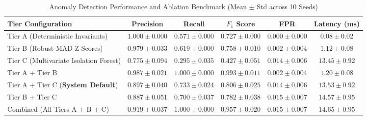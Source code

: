 \begin{table}[t]
\centering
\small
\caption{Anomaly Detection Performance and Ablation Benchmark (Mean $\pm$ Std across 10 Seeds)}
\label{tab:anomaly}
\begin{tabular}{lccccc}
\toprule
\textbf{Tier Configuration} & \textbf{Precision} & \textbf{Recall} & \textbf{$F_1$ Score} & \textbf{FPR} & \textbf{Latency (ms)} \\
\midrule
Tier A (Deterministic Invariants) & $\mathbf{1.000 \pm 0.000}$ & $0.571 \pm 0.000$ & $0.727 \pm 0.000$ & $\mathbf{0.000 \pm 0.000}$ & $0.08 \pm 0.02$ \\
Tier B (Robust MAD Z-Scores) & $0.979 \pm 0.033$ & $0.619 \pm 0.000$ & $0.758 \pm 0.010$ & $0.002 \pm 0.004$ & $1.12 \pm 0.08$ \\
Tier C (Multivariate Isolation Forest) & $0.775 \pm 0.094$ & $0.295 \pm 0.035$ & $0.427 \pm 0.051$ & $0.014 \pm 0.006$ & $13.45 \pm 0.92$ \\
Tier A + Tier B & $0.987 \pm 0.021$ & $\mathbf{1.000 \pm 0.000}$ & $\mathbf{0.993 \pm 0.011}$ & $0.002 \pm 0.004$ & $1.20 \pm 0.08$ \\
Tier A + Tier C (\textbf{System Default}) & $0.897 \pm 0.040$ & $0.733 \pm 0.024$ & $0.806 \pm 0.025$ & $0.014 \pm 0.006$ & $13.53 \pm 0.92$ \\
Tier B + Tier C & $0.887 \pm 0.051$ & $0.700 \pm 0.037$ & $0.782 \pm 0.038$ & $0.015 \pm 0.007$ & $14.57 \pm 0.95$ \\
Combined (All Tiers A + B + C) & $0.919 \pm 0.037$ & $\mathbf{1.000 \pm 0.000}$ & $0.957 \pm 0.020$ & $0.015 \pm 0.007$ & $14.65 \pm 0.95$ \\
\bottomrule
\end{tabular}
\end{table}
